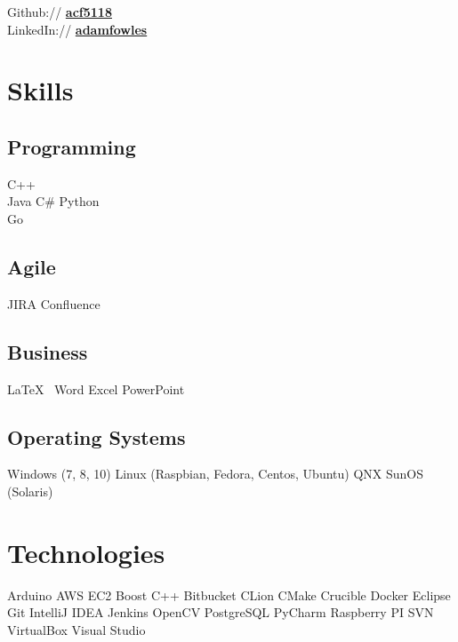 \documentclass[letterpaper]{deedy-resume} %
\begin{document}
\begin{minipage}[t]{0.33\textwidth}
Github:// \href{https://github.com/acf5118}{\bf acf5118} \\
LinkedIn:// \href{https://www.linkedin.com/in/adamfowles}{\bf adamfowles} \\

\sectionspace %

\section{Skills}

\subsection{Programming}
C++ \\
Java \textbullet{} C\# \textbullet{} Python\\
Go
\smallskip
\subsection{Agile}
JIRA \textbullet{} Confluence
\smallskip
\subsection{Business}
\LaTeX\ \textbullet{} Word \textbullet{} Excel
\textbullet{} PowerPoint
\smallskip
\subsection{Operating Systems}
Windows (7, 8, 10) \textbullet{} Linux (Raspbian, Fedora, Centos, Ubuntu)
\textbullet{} QNX \textbullet{} SunOS (Solaris)



\sectionspace %

\section{Technologies}
Arduino \textbullet{} AWS EC2 \textbullet{} Boost C++ \textbullet{} Bitbucket \textbullet{} CLion \textbullet{} CMake \textbullet{} Crucible \textbullet{} Docker \textbullet{} Eclipse \textbullet{} Git \textbullet{} IntelliJ IDEA \textbullet{} Jenkins \textbullet{} OpenCV \textbullet{} PostgreSQL \textbullet{} PyCharm  \textbullet{} Raspberry PI \textbullet{} SVN \textbullet{} VirtualBox \textbullet{} Visual Studio


\end{minipage}
\end{document}
